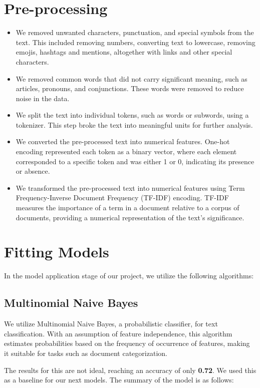 \documentclass[11pt, a4paper]{article}
\begin{document}
\begin{large}
\section{Pre-processing}
\begin{itemize}
    \item We removed unwanted characters, punctuation, and special symbols from the text. This included removing numbers, converting text to lowercase, removing emojis, hashtags and mentions, altogether with links and other special characters.
    \item We removed common words that did not carry significant meaning, such as articles, pronouns, and conjunctions. These words were removed to reduce noise in the data.
    \item We split the text into individual tokens, such as words or subwords, using a tokenizer. This step broke the text into meaningful units for further analysis.
    \item We converted the pre-processed text into numerical features. One-hot encoding represented each token as a binary vector, where each element corresponded to a specific token and was either 1 or 0, indicating its presence or absence.
    \item We transformed the pre-processed text into numerical features using Term Frequency-Inverse Document Frequency (TF-IDF) encoding. TF-IDF measures the importance of a term in a document relative to a corpus of documents, providing a numerical representation of the text's significance.
\end{itemize}

\section{Fitting Models}

In the model application stage of our project, we utilize the following algorithms:

\subsection{Multinomial Naive Bayes}

We utilize Multinomial Naive Bayes, a probabilistic classifier, for text classification. With an assumption of feature independence, this algorithm estimates probabilities based on the frequency of occurrence of features, making it suitable for tasks such as document categorization.

The results for this are not ideal, reaching an accuracy of only \textbf{0.72}. We used this as a baseline for our next models.
The summary of the model is as follows:


\end{large}
\end{document}
